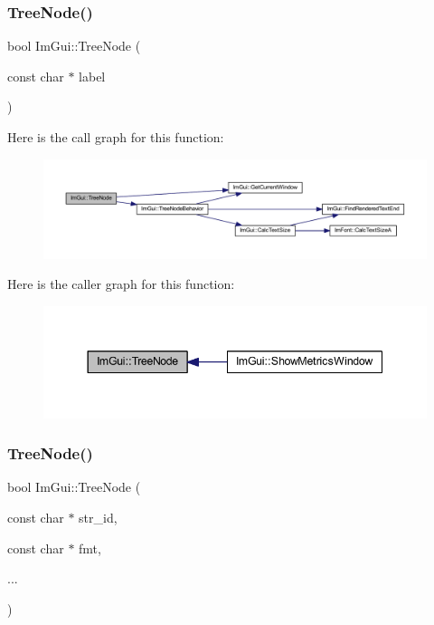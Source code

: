 \subsubsection{\texorpdfstring{Tree\+Node()}{TreeNode()}\hspace{0.1cm}{\footnotesize\ttfamily [1/3]}}
{\footnotesize\ttfamily bool Im\+Gui\+::\+Tree\+Node (\begin{DoxyParamCaption}\item[{const char $\ast$}]{label }\end{DoxyParamCaption})}

Here is the call graph for this function\+:
\nopagebreak
\begin{figure}[H]
\begin{center}
\leavevmode
\includegraphics[width=350pt]{namespace_im_gui_a4dff507ce8bbe0da9556bb50b1e60d7f_cgraph}
\end{center}
\end{figure}
Here is the caller graph for this function\+:
\nopagebreak
\begin{figure}[H]
\begin{center}
\leavevmode
\includegraphics[width=344pt]{namespace_im_gui_a4dff507ce8bbe0da9556bb50b1e60d7f_icgraph}
\end{center}
\end{figure}
\mbox{\label{namespace_im_gui_a6e6e4de20291002430854cbd8cd58843}} 
\subsubsection{\texorpdfstring{Tree\+Node()}{TreeNode()}\hspace{0.1cm}{\footnotesize\ttfamily [2/3]}}
{\footnotesize\ttfamily bool Im\+Gui\+::\+Tree\+Node (\begin{DoxyParamCaption}\item[{const char $\ast$}]{str\+\_\+id,  }\item[{const char $\ast$}]{fmt,  }\item[{}]{... }\end{DoxyParamCaption})}

